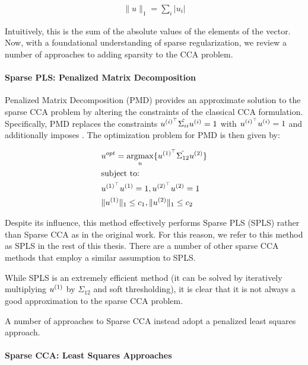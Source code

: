 \begin{align}
    \|u\|_1 = \sum_i |u_i|
\end{align}

Intuitively, this is the sum of the absolute values of the elements of the vector.
Now, with a foundational understanding of sparse regularization, we review a number of approaches to adding sparsity to the CCA problem.

\paragraph{Sparse PLS: Penalized Matrix Decomposition}
Penalized Matrix Decomposition (PMD) \citep{witten2009penalized} provides an approximate solution to the sparse CCA problem by altering the constraints of the classical CCA formulation.
Specifically, PMD replaces the constraints \(u^{(i)^{\top}} \hat{\Sigma_{ii}} u^{(i)} = 1\) with \(u^{(i)^{\top}} u^{(i)}= 1\) and additionally imposes .
The optimization problem for PMD is then given by:

\begin{align}
    & u^{opt}=\underset{u}{\mathrm{argmax}}\{ u^{(1)^{\top}} \hat{\Sigma_{12}} u^{(2)} \} \\
    & \text{subject to:} \notag \\
    & u^{(1)^{\top}} u^{(1)} = 1 , u^{(2)^{\top}} u^{(2)} = 1 \notag \\
    & \|u^{(1)}\|_1 \leq c_1 , \|u^{(2)}\|_1 \leq c_2 \notag
\end{align}

Despite its influence, this method effectively performs Sparse PLS (SPLS) rather than Sparse CCA as in the original work.
For this reason, we refer to this method as SPLS in the rest of this thesis.
There are a number of other sparse CCA methods that employ a similar assumption to SPLS\citep{parkhomenko2009sparse, waaijenborg2008quantifying}.

While SPLS is an extremely efficient method (it can be solved by iteratively multiplying $u^{(1)}$ by $\hat{\Sigma_{12}}$ and soft thresholding), it is clear that it is not always a good approximation to the sparse CCA problem.

A number of approaches to Sparse CCA instead adopt a penalized least squares approach.

\paragraph{Sparse CCA: Least Squares Approaches}

